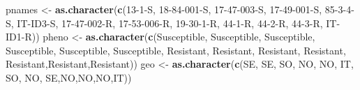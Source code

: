 \documentclass[
  openany]{book}
\newenvironment{Shaded}{\begin{snugshade}}{\end{snugshade}}
\newcommand{\FunctionTok}[1]{\textcolor[rgb]{0.13,0.29,0.53}{\textbf{#1}}}
\newcommand{\NormalTok}[1]{#1}
\newcommand{\OtherTok}[1]{\textcolor[rgb]{0.56,0.35,0.01}{#1}}
\newcommand{\StringTok}[1]{\textcolor[rgb]{0.31,0.60,0.02}{#1}}
\theoremstyle{definition}
\theoremstyle{definition}
\theoremstyle{definition}
\theoremstyle{definition}
\theoremstyle{remark}
\begin{document}
\begin{Shaded}
\begin{Highlighting}[]
\NormalTok{pnames }\OtherTok{\textless{}{-}} \FunctionTok{as.character}\NormalTok{(}\FunctionTok{c}\NormalTok{(}\StringTok{\textquotesingle{}13{-}1{-}S\textquotesingle{}}\NormalTok{, }\StringTok{\textquotesingle{}18{-}84{-}001{-}S\textquotesingle{}}\NormalTok{, }\StringTok{\textquotesingle{}17{-}47{-}003{-}S\textquotesingle{}}\NormalTok{, }\StringTok{\textquotesingle{}17{-}49{-}001{-}S\textquotesingle{}}\NormalTok{, }\StringTok{\textquotesingle{}85{-}3{-}4{-}S\textquotesingle{}}\NormalTok{, }\StringTok{\textquotesingle{}IT{-}ID3{-}S\textquotesingle{}}\NormalTok{, }\StringTok{\textquotesingle{}17{-}47{-}002{-}R\textquotesingle{}}\NormalTok{, }\StringTok{\textquotesingle{}17{-}53{-}006{-}R\textquotesingle{}}\NormalTok{, }\StringTok{\textquotesingle{}19{-}30{-}1{-}R\textquotesingle{}}\NormalTok{, }\StringTok{\textquotesingle{}44{-}1{-}R\textquotesingle{}}\NormalTok{, }\StringTok{\textquotesingle{}44{-}2{-}R\textquotesingle{}}\NormalTok{, }\StringTok{\textquotesingle{}44{-}3{-}R\textquotesingle{}}\NormalTok{, }\StringTok{\textquotesingle{}IT{-}ID1{-}R\textquotesingle{}}\NormalTok{))}
\NormalTok{pheno }\OtherTok{\textless{}{-}} \FunctionTok{as.character}\NormalTok{(}\FunctionTok{c}\NormalTok{(}\StringTok{\textquotesingle{}Susceptible\textquotesingle{}}\NormalTok{,   }\StringTok{\textquotesingle{}Susceptible\textquotesingle{}}\NormalTok{,  }\StringTok{\textquotesingle{}Susceptible\textquotesingle{}}\NormalTok{, }\StringTok{\textquotesingle{}Susceptible\textquotesingle{}}\NormalTok{, }\StringTok{\textquotesingle{}Susceptible\textquotesingle{}}\NormalTok{, }\StringTok{\textquotesingle{}Susceptible\textquotesingle{}}\NormalTok{, }\StringTok{\textquotesingle{}Resistant\textquotesingle{}}\NormalTok{, }\StringTok{\textquotesingle{}Resistant\textquotesingle{}}\NormalTok{, }\StringTok{\textquotesingle{}Resistant\textquotesingle{}}\NormalTok{, }\StringTok{\textquotesingle{}Resistant\textquotesingle{}}\NormalTok{, }\StringTok{\textquotesingle{}Resistant\textquotesingle{}}\NormalTok{,}\StringTok{\textquotesingle{}Resistant\textquotesingle{}}\NormalTok{,}\StringTok{\textquotesingle{}Resistant\textquotesingle{}}\NormalTok{))}
\NormalTok{geo }\OtherTok{\textless{}{-}} \FunctionTok{as.character}\NormalTok{(}\FunctionTok{c}\NormalTok{(}\StringTok{\textquotesingle{}SE\textquotesingle{}}\NormalTok{,   }\StringTok{\textquotesingle{}SE\textquotesingle{}}\NormalTok{,  }\StringTok{\textquotesingle{}SO\textquotesingle{}}\NormalTok{, }\StringTok{\textquotesingle{}NO\textquotesingle{}}\NormalTok{,   }\StringTok{\textquotesingle{}NO\textquotesingle{}}\NormalTok{,  }\StringTok{\textquotesingle{}IT\textquotesingle{}}\NormalTok{, }\StringTok{\textquotesingle{}SO\textquotesingle{}}\NormalTok{,   }\StringTok{\textquotesingle{}NO\textquotesingle{}}\NormalTok{,  }\StringTok{\textquotesingle{}SE\textquotesingle{}}\NormalTok{,}\StringTok{\textquotesingle{}NO\textquotesingle{}}\NormalTok{,}\StringTok{\textquotesingle{}NO\textquotesingle{}}\NormalTok{,}\StringTok{\textquotesingle{}NO\textquotesingle{}}\NormalTok{,}\StringTok{\textquotesingle{}IT\textquotesingle{}}\NormalTok{))}

\end{Highlighting}
\end{Shaded}
\end{document}
